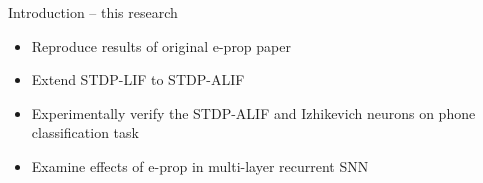 \documentclass[t]{beamer}
\begin{document}
  \begin{frame}{Introduction -- this research}

    \begin{itemize}[label=--]
      \item Reproduce results of original e-prop paper
      \item Extend STDP-LIF to STDP-ALIF
      \item Experimentally verify the STDP-ALIF and Izhikevich neurons on phone classification task
      \item Examine effects of e-prop in multi-layer recurrent SNN
    \end{itemize}
  \end{frame}
\end{document}
